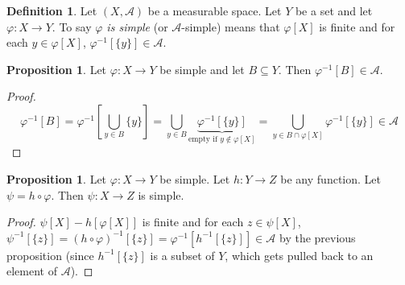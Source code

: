 \documentclass{article}
\theoremstyle{definition}
\newtheorem{proposition}[theorem]{Proposition}
\newtheorem*{definition}{Definition}
\begin{document}
\begin{definition}
    Let $(X, \mathscr{A})$ be a measurable space. Let $Y$ be a set and let $\varphi: X \longrightarrow Y$.
    To say \emph{$\varphi$ is simple} (or $\mathscr{A}$-simple) means that $\varphi[X]$ is finite and for each $y \in \varphi[X]$, $\varphi^{-1}[\{y\}] \in \mathscr{A}$.
\end{definition}

\begin{proposition}
    Let $\varphi: X \longrightarrow Y$ be simple and let $B \subseteq Y$. Then $\varphi^{-1}[B] \in \mathscr{A}$.
\end{proposition}
\begin{proof}
    \[
        \varphi^{-1}[B] = \varphi^{-1}\left[\bigcup_{y \in B} \{y\} \right] = \bigcup_{y \in B} \underbrace{\varphi^{-1}[\{y\}]}_{\text{empty if } y \notin \varphi[X]} = \bigcup_{y \in B \cap \varphi[X]} \varphi^{-1}[\{y\}] \in \mathscr{A}
    \]
\end{proof}

\begin{proposition}
    Let $\varphi: X \longrightarrow Y$ be simple. Let $h: Y \longrightarrow Z$ be any function. Let $\psi = h \circ \varphi$. Then $\psi: X \longrightarrow Z$ is simple.
\end{proposition}
\begin{proof}
    $\psi[X] - h[\varphi[X]]$ is finite and for each $z \in \psi[X]$, $\psi^{-1}[\{z\}] = (h \circ \varphi)^{-1}[\{z\}] = \varphi^{-1}[h^{-1}[\{z\}]] \in \mathscr{A}$ by the previous proposition (since $h^{-1}[\{z\}]$ is a subset of $Y$, which gets pulled back to an element of $\mathscr{A}$).
\end{proof}
\end{document}
